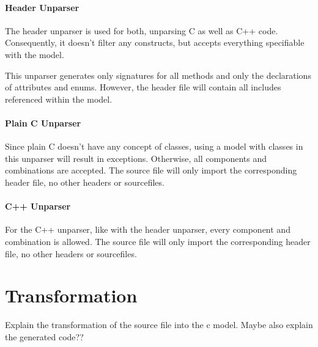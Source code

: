 \documentclass{report}
\begin{document}
\paragraph{Header Unparser}
The header unparser is used for both, unparsing C as well as C++ code. Consequently, it doesn't filter any constructs, but accepts everything specifiable with the model.

This unparser generates only signatures for all methods and only the declarations of attributes and enums. However, the header file will contain all includes referenced within the model.

\paragraph{Plain C Unparser}
Since plain C doesn't have any concept of classes, using a model with classes in this unparser will result in exceptions. Otherwise, all components and combinations are accepted. The source file will only import the corresponding header file, no other headers or sourcefiles.

\paragraph{C++ Unparser}
For the C++ unparser, like with the header unparser, every component and combination is allowed. The source file will only import the corresponding header file, no other headers or sourcefiles.

\section{Transformation}
Explain the transformation of the source file into the c model. Maybe also explain the generated code??


\newpage
\pagestyle{empty}


\end{document}
